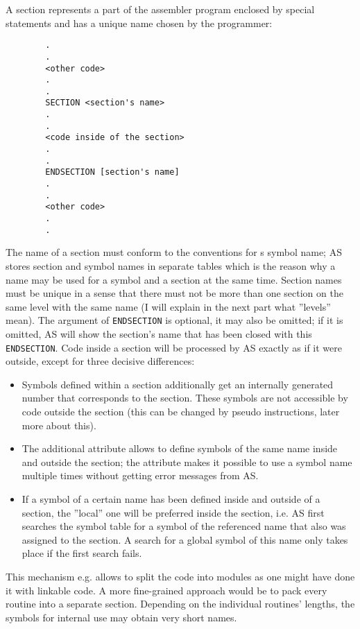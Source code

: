 \documentclass[12pt,twoside]{report}
\newcommand{\tty}[1]{{\tt #1}}
\begin{document}
A section represents a part of the assembler program enclosed by
special statements and has a unique name chosen by the programmer:
\begin{verbatim}
        .
        .
        <other code>
        .
        .
        SECTION <section's name>
        .
        .
        <code inside of the section>
        .
        .
        ENDSECTION [section's name]
        .
        .
        <other code>
        .
        .
\end{verbatim}
The name of a section must conform to the conventions for s symbol
name; AS stores section and symbol names in separate tables which is
the reason why a name may be used for a symbol and a section at the
same time.  Section names must be unique in a sense that there must
not be more than one section on the same level with the same name (I
will explain in the next part what ''levels'' mean).  The argument of
\tty{ENDSECTION} is optional, it may also be omitted; if it is omitted, AS
will show the section's name that has been closed with this
\tty{ENDSECTION}.  Code inside a section will be processed by AS exactly
as if it were outside, except for three decisive differences:
\begin{itemize}
\item{Symbols defined within a section additionally get an internally
      generated number that corresponds to the section.  These symbols
      are not accessible by code outside the section (this can be
      changed by pseudo instructions, later more about this).}
\item{The additional attribute allows to define symbols of the same
      name inside and outside the section; the attribute makes it
      possible to use a symbol name multiple times without getting error
      messages from AS.}
\item{If a symbol of a certain name has been defined inside and outside
      of a section, the ''local'' one will be preferred inside the
      section, i.e. AS first searches the symbol table for a symbol of
      the referenced name that also was assigned to the section.  A
      search for a global symbol of this name only takes place if the
      first search fails.}
\end{itemize}
This mechanism e.g. allows to split the code into modules as one
might have done it with linkable code.  A more fine-grained approach
would be to pack every routine into a separate section.  Depending on
the individual routines' lengths, the symbols for internal use may
obtain very short names.
\end{document}
